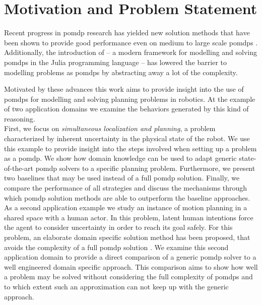 \section{Motivation and Problem Statement}

Recent progress in \ac{pomdp} research has yielded new solution methods that
have been shown to provide good performance even on medium to large scale
\acp{pomdp} \cite{somani2013despot,sunberg2018online}. Additionally, the
introduction of \pomdpsjl \cite{egorov2017pomdps} -- a modern framework for
modelling and solving \acp{pomdp} in the Julia programming language -- has
lowered the barrier to modelling problems as \acp{pomdp} by abstracting away
a lot of the complexity.

Motivated by these advances this work aims to provide insight into the use of
\acp{pomdp} for modelling and solving planning problems in robotics. At the
example of two application domains we examine the behaviors generated by this
kind of reasoning.\\
First, we focus on \emph{simultaneous localization and
planning}, a problem characterized by inherent uncertainty in the physical
state of the robot. We use this example to provide insight into the steps
involved when setting up a problem as a \ac{pomdp}. We show how
domain knowledge can be used to adapt generic state-of-the-art \ac{pomdp}
solvers to a specific planning problem. Furthermore, we present two baselines
that may be used instead of a full \ac{pomdp} solution. Finally, we compare the
performance of all strategies and discuss the mechanisms through which
\ac{pomdp} solution methods are able to outperform the baseline approaches.\\
As a second application example we study an instance of motion planning in
a shared space with a human actor. In this problem, latent human intentions
force the agent to consider uncertainty in order to reach its goal safely. For
this problem, an elaborate domain specific solution method has been proposed,
that avoids the complexity of a full \ac{pomdp} solution
\cite{fisac2018probabilistically}. We examine this second application domain to
provide a direct comparison of a generic \ac{pomdp} solver to a well engineered
domain specific approach. This comparison aims to show how well a problem may
be solved without considering the full complexity of \acp{pomdp} and to which
extent such an approximation can not keep up with the generic approach.


